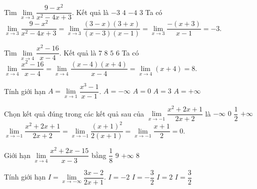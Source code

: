 \begin{ex}%
	Tìm $\lim\limits_{x\to 3} \dfrac {9-x^2}{x^2-4x+3}$. Kết quả là
	\choice
	{\True $-3$}
	{$4$}
	{$-4$}
	{$3$}
	\loigiai
	{Ta có $\lim\limits_{x\to 3} \dfrac {9-x^2}{x^2-4x+3}=\lim\limits_{x\to 3} \dfrac {(3-x)(3+x)}{(x-3)(x-1)}=\lim\limits_{x\to 3} \dfrac {-(x+3)}{x-1}=-3$.
	}
\end{ex}
\begin{ex}%
Tìm $\lim\limits_{x\to 4} \dfrac {x^2-16}{x-4}$. Kết quả là
	\choice
	{$7$}
	{\True $8$}
	{$5$}
	{$6$}
	\loigiai
	{Ta có $\lim\limits_{x\to 4} \dfrac {x^2-16}{x-4}=\lim\limits_{x\to 4} \dfrac {(x-4)(x+4)}{x-4}=\lim\limits_{x\to 4} (x+4)=8$.
	}
\end{ex}
\begin{ex}%
Tính giới hạn $A=\lim\limits_{x\to 1} \dfrac {x^3-1}{x-1}$.
\choice
{$A=-\infty $}
{$A=0$}
{\True $A=3$}
{$A=+\infty $}
\end{ex}
\begin{ex}%
Chọn kết quả đúng trong các kết quả sau của $\lim\limits_{x\to -1} \dfrac {x^2+2x+1}{2x+2}$ là
	\choice
	{$-\infty $}
	{\True $0$}
	{$\dfrac {1}{2}$}
	{$+\infty $}
	\loigiai
	{$\lim\limits_{x\to -1} \dfrac {x^2+2x+1}{2x+2}=\lim\limits_{x\to -1} \dfrac {(x+1)^2}{2(x+1)}=\lim\limits_{x\to -1} \dfrac {x+1}{2}=0$.
	}
\end{ex}
\begin{ex}%
Giới hạn $\lim\limits_{x\to 4} \dfrac {x^2+2x-15}{x-3}$ bằng
	\choice
	{$\dfrac {1}{8}$}
	{\True $9$}
	{$+\infty $}
	{$8$}
\end{ex}
\begin{ex}%
	 Tính giới hạn $I=\lim\limits_{x\to -\infty } \dfrac {3x-2}{2x+1}$.
	 \choice
	 {$I=-2$}
	 {$I=-\dfrac {3}{2}$}
	 {$I=2$}
	 {\True $I=\dfrac {3}{2}$}
\end{ex}
